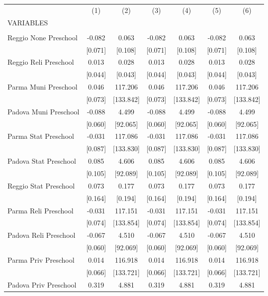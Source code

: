 \begin{tabular}{lcccccc} \hline
 & (1) & (2) & (3) & (4) & (5) & (6) \\
VARIABLES &  &  &  &  &  &  \\ \hline
 &  &  &  &  &  &  \\
Reggio None Preschool & -0.082 & 0.063 & -0.082 & 0.063 & -0.082 & 0.063 \\
 & [0.071] & [0.108] & [0.071] & [0.108] & [0.071] & [0.108] \\
Reggio Reli Preschool & 0.013 & 0.028 & 0.013 & 0.028 & 0.013 & 0.028 \\
 & [0.044] & [0.043] & [0.044] & [0.043] & [0.044] & [0.043] \\
Parma Muni Preschool & 0.046 & 117.206 & 0.046 & 117.206 & 0.046 & 117.206 \\
 & [0.073] & [133.842] & [0.073] & [133.842] & [0.073] & [133.842] \\
Padova Muni Preschool & -0.088 & 4.499 & -0.088 & 4.499 & -0.088 & 4.499 \\
 & [0.060] & [92.065] & [0.060] & [92.065] & [0.060] & [92.065] \\
Parma Stat Preschool & -0.031 & 117.086 & -0.031 & 117.086 & -0.031 & 117.086 \\
 & [0.087] & [133.830] & [0.087] & [133.830] & [0.087] & [133.830] \\
Padova Stat Preschool & 0.085 & 4.606 & 0.085 & 4.606 & 0.085 & 4.606 \\
 & [0.105] & [92.089] & [0.105] & [92.089] & [0.105] & [92.089] \\
Reggio Stat Preschool & 0.073 & 0.177 & 0.073 & 0.177 & 0.073 & 0.177 \\
 & [0.164] & [0.194] & [0.164] & [0.194] & [0.164] & [0.194] \\
Parma Reli Preschool & -0.031 & 117.151 & -0.031 & 117.151 & -0.031 & 117.151 \\
 & [0.074] & [133.854] & [0.074] & [133.854] & [0.074] & [133.854] \\
Padova Reli Preschool & -0.067 & 4.510 & -0.067 & 4.510 & -0.067 & 4.510 \\
 & [0.060] & [92.069] & [0.060] & [92.069] & [0.060] & [92.069] \\
Parma Priv Preschool & 0.014 & 116.918 & 0.014 & 116.918 & 0.014 & 116.918 \\
 & [0.066] & [133.721] & [0.066] & [133.721] & [0.066] & [133.721] \\
Padova Priv Preschool & 0.319 & 4.881 & 0.319 & 4.881 & 0.319 & 4.881 \\

\end{tabular}
